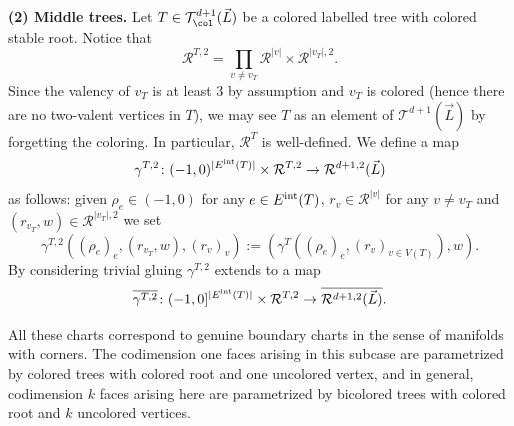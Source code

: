 	\textbf{(2) Middle trees.} Let $T\in \mathcal{T}^{d+1}_\col(\vec{L})$ be a colored labelled tree with colored stable root. Notice that $$\mathcal{R}^{T,2}=\prod_{v\neq v_T}\mathcal{R}^{|v|}\times \mathcal{R}^{|v_T|,2}.$$ Since the valency of $v_T$ is at least $3$ by assumption and $v_T$ is colored (hence there are no two-valent vertices in $T$), we may see $T$ as an element of $\mathcal{T}^{d+1}(\vec{L})$ by forgetting the coloring. In particular, $\mathcal{R}^{T}$ is well-defined. We define a map $$\gamma^{T,2}\colon (-1,0)^{|E^\textnormal{int}(T)|}\times \mathcal{R}^{T,2}\to \mathcal{R}^{d+1,2}(\vec{L})$$ as follows: given $\rho_e\in (-1,0)$ for any $e\in E^\textnormal{int}(T)$, $r_v\in \mathcal{R}^{|v|}$ for any $v\neq v_T$ and $(r_{v_T},w)\in \mathcal{R}^{|v_T|,2}$ we set $$\gamma^{T,2}\left((\rho_e)_e, (r_{v_T},w), (r_v)_v\right):= \left(\gamma^{T}\left((\rho_e)_e, (r_v)_{v\in V(T)}\right), w\right).$$ By considering trivial gluing $\gamma^{T,2}$ extends to a map $$\overline{\gamma^{T,2}}\colon (-1,0]^{|E^\textnormal{int}(T)|}\times \mathcal{R}^{T,2}\to \overline{\mathcal{R}^{d+1,2}(\vec{L})}.$$
	\begin{rem}
		All these charts correspond to genuine boundary charts in the sense of manifolds with corners. The codimension one faces arising in this subcase are parametrized by colored trees with colored root and one uncolored vertex, and in general, codimension $k$ faces arising here are parametrized by bicolored trees with colored root and $k$ uncolored vertices.
	\end{rem}
	

